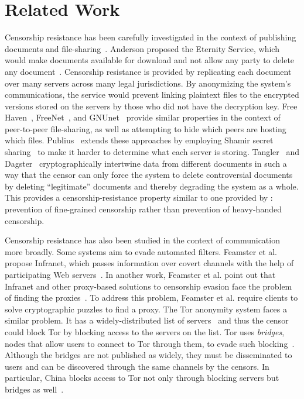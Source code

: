 \section{Related Work}

Censorship resistance has been carefully investigated in the context of
publishing documents and
file-sharing~\cite{eternity,freehaven,freenet,gnunet-esed,publius,tangler,dagster}.
Anderson proposed the Eternity Service, which would make documents
available for download and not allow any party to delete any
document~\cite{eternity}. Censorship resistance is provided by
replicating each document over many servers across many legal
jurisdictions. By anonymizing the system's communications, the service
would prevent linking plaintext files to the encrypted versions stored
on the servers by those who did not have the decryption key. Free
Haven~\cite{freehaven}, FreeNet~\cite{freenet}, and
GNUnet~\cite{gnunet-esed} provide similar properties in the context of
peer-to-peer file-sharing, as well as attempting to hide which peers are
hosting which files. Publius~\cite{publius} extends these approaches by
employing Shamir secret sharing~\cite{shamir} to make it harder to
determine what each server is storing. Tangler~\cite{tangler} and
Dagster~\cite{dagster} cryptographically intertwine data from different
documents in such a way that the censor can only force the system to
delete controversial documents by deleting ``legitimate'' documents and
thereby degrading the system as a whole. This provides a
censorship-resistance property similar to one provided by \hoot:
prevention of fine-grained censorship rather than prevention of
heavy-handed censorship.

Censorship resistance has also been studied in the context of
communication more broadly. Some systems aim to evade automated
filters. Feamster et al. propose Infranet, which passes information over
covert channels with the help of participating Web
servers~\cite{infranet}. In another work, Feamster et al. point out that
Infranet and other proxy-based solutions to censorship evasion face the
problem of finding the proxies~\cite{feamster03proxy}. To address this
problem, Feamster et al. require clients to solve cryptographic puzzles
to find a proxy. The Tor anonymity system faces a similar problem. It
has a widely-distributed list of servers~\cite{tor} and thus the censor
could block Tor by blocking access to the servers on the list. Tor uses
{\em bridges}, nodes that allow users to connect to Tor through them, to
evade such blocking~\cite{tor-bridges}. Although the bridges are not
published as widely, they must be disseminated to users and can be
discovered through the same channels by the censors. In particular,
China blocks access to Tor not only through blocking servers but bridges
as well~\cite{tor-china}.


